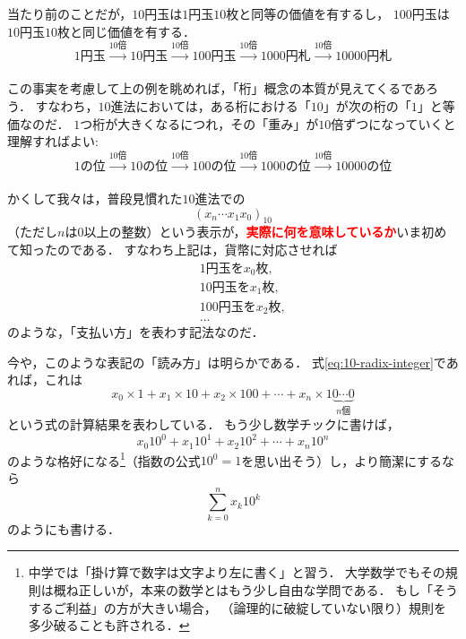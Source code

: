 \documentclass[a5j, uplatex, dvipdfmx]{jsbook}
\newcommand{\emphasize}[1]{\textcolor{red}{\textbf{#1}}}
\begin{document}
    当たり前のことだが，$10$円玉は$1$円玉$10$枚と同等の価値を有するし，
    $100$円玉は$10$円玉$10$枚と同じ価値を有する．
    \begin{equation*}
        1円玉 \xrightarrow[]{10倍} 10円玉 \xrightarrow[]{10倍} 100円玉 \xrightarrow[]{10倍} 1000円札 \xrightarrow[]{10倍} 10000円札
    \end{equation*}

    この事実を考慮して上の例を眺めれば，「桁」概念の本質が見えてくるであろう．
    すなわち，$10$進法においては，ある桁における「$10$」が次の桁の「$1$」と等価なのだ．
    $1$つ桁が大きくなるにつれ，その「重み」が$10$倍ずつになっていくと理解すればよい:
    \begin{equation*}
        1の位 \xrightarrow[]{10倍} 10の位 \xrightarrow[]{10倍} 100の位 \xrightarrow[]{10倍} 1000の位 \xrightarrow[]{10倍} 10000の位
    \end{equation*}

    かくして我々は，普段見慣れた$10$進法での
    \begin{equation}
        (x_n \cdots x_1 x_0)_{10}  \label{eq:10-radix-integer}
    \end{equation}
    （ただし$n$は$0$以上の整数）という表示が，\emphasize{実際に何を意味しているか}いま初めて知ったのである．
    すなわち上記は，貨幣に対応させれば
    \begin{eqnarray*}
        &&1円玉を x_0 枚, \\
        &&10円玉を x_1 枚, \\
        &&100円玉を x_2 枚, \\
        &&...
    \end{eqnarray*}
    のような，「支払い方」を表わす記法なのだ．

    今や，このような表記の「読み方」は明らかである．
    式\eqref{eq:10-radix-integer}であれば，これは
    \begin{equation*}
        x_0 \times 1 + x_1 \times 10 + x_2 \times 100 + \cdots + x_n \times 1\underbrace{0\cdots 0}_{n個}
    \end{equation*}
    という式の計算結果を表わしている．
    もう少し数学チックに書けば，
    \begin{equation*}
        x_0 10^0 + x_1 10^1 + x_2 10^2 + \cdots + x_n 10^n
    \end{equation*}
    のような格好になる\footnote{
        中学では「掛け算で数字は文字より左に書く」と習う．
        大学数学でもその規則は概ね正しいが，本来の数学とはもう少し自由な学問である．
        もし「そうするご利益」の方が大きい場合，
        （論理的に破綻していない限り）規則を多少破ることも許される．
    }（指数の公式$10^0 = 1$を思い出そう）し，より簡潔にするなら
    \begin{equation*}
        \sum_{k=0}^n x_k 10^k
    \end{equation*}
    のようにも書ける．
\end{document}
